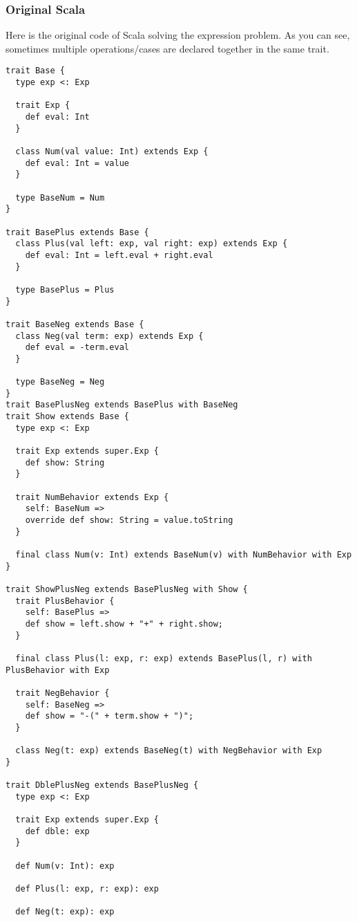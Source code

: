 \subsubsection{Original Scala}
Here is the original code of Scala solving the expression problem.
As you can see, sometimes multiple operations/cases are declared together in
the same trait.
\lstset{language=Scala}
\begin{lstlisting}
trait Base {
  type exp <: Exp

  trait Exp {
    def eval: Int
  }

  class Num(val value: Int) extends Exp {
    def eval: Int = value
  }

  type BaseNum = Num
}

trait BasePlus extends Base {
  class Plus(val left: exp, val right: exp) extends Exp {
    def eval: Int = left.eval + right.eval
  }

  type BasePlus = Plus
}

trait BaseNeg extends Base {
  class Neg(val term: exp) extends Exp {
    def eval = -term.eval
  }

  type BaseNeg = Neg
}
trait BasePlusNeg extends BasePlus with BaseNeg
trait Show extends Base {
  type exp <: Exp

  trait Exp extends super.Exp {
    def show: String
  }

  trait NumBehavior extends Exp {
    self: BaseNum =>
    override def show: String = value.toString
  }

  final class Num(v: Int) extends BaseNum(v) with NumBehavior with Exp
}

trait ShowPlusNeg extends BasePlusNeg with Show {
  trait PlusBehavior {
    self: BasePlus =>
    def show = left.show + "+" + right.show;
  }

  final class Plus(l: exp, r: exp) extends BasePlus(l, r) with PlusBehavior with Exp

  trait NegBehavior {
    self: BaseNeg =>
    def show = "-(" + term.show + ")";
  }
  
  class Neg(t: exp) extends BaseNeg(t) with NegBehavior with Exp
}

trait DblePlusNeg extends BasePlusNeg {
  type exp <: Exp

  trait Exp extends super.Exp {
    def dble: exp
  }

  def Num(v: Int): exp

  def Plus(l: exp, r: exp): exp

  def Neg(t: exp): exp


\end{lstlisting}
